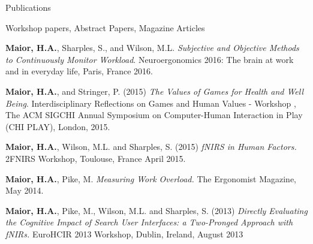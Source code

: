 \documentclass{resume} %
\begin{document}
\begin{rSection}{Publications}
\begin{rSubsection}{ }{ }{ }{Workshop papers, Abstract Papers, Magazine Articles}
	\item \textbf{Maior, H.A.}, Sharples, S., and Wilson, M.L. \emph{Subjective and Objective Methods to Continuously Monitor Workload}. Neuroergonomics 2016: The brain at work and in everyday life, Paris, France 2016.
    \item \textbf{Maior, H.A.}, and Stringer, P. (2015) \emph{The Values of Games for Health and Well Being}. Interdisciplinary Reflections on Games and Human Values - Workshop , The ACM SIGCHI Annual Symposium on Computer-Human Interaction in Play (CHI PLAY), London, 2015.
    \item \textbf{Maior, H.A.}, Wilson, M.L. and Sharples, S. (2015) \emph{fNIRS in Human Factors.} 2FNIRS Workshop, Toulouse, France April 2015.
    \item \textbf{Maior, H.A.}, Pike, M. \emph{Measuring Work Overload.} The Ergonomist Magazine, May 2014.
    \item \textbf{Maior, H.A.}, Pike, M., Wilson, M.L. and Sharples, S. (2013) \emph{Directly Evaluating the Cognitive Impact of Search User Interfaces: a Two-Pronged Approach with fNIRs.} EuroHCIR 2013 Workshop, Dublin, Ireland, August 2013
\end{rSubsection}

\end{rSection}
\vspace{-2 mm}

\end{document}
